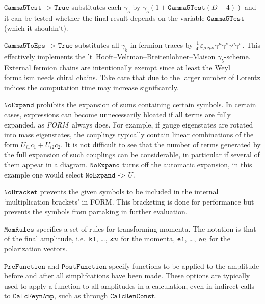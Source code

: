 \documentclass[twoside,11pt]{article}
\def\FO{\textit{FORM}}
\def\Var#1{\ensuremath{\mathit{#1}}}
\def\Vn{\Var{n}}
\def\Code#1{\ensuremath{\texttt{#1}}}
\def\ie{i.e.\ }
\begin{document}
\Code{Gamma5Test -> True} substitutes each $\gamma_5$ by
$\gamma_5 (1 + \Code{Gamma5Test} (D - 4))$ and it can be tested whether 
the final result depends on the variable \Code{Gamma5Test} (which it 
shouldn't).

%
%
\Code{Gamma5ToEps -> True} substitutes all $\gamma_5$ in fermion 
traces by $\frac 1{4!} \varepsilon_{\mu\nu\rho\sigma} \gamma^\mu 
\gamma^\nu \gamma^\rho \gamma^\sigma$.  This effectively implements the 
't~Hooft--Veltman--Breitenlohner--Maison $\gamma_5$-scheme.  External 
fermion chains are intentionally exempt since at least the Weyl 
formalism needs chiral chains.  Take care that due to the larger number 
of Lorentz indices the computation time may increase significantly.

%
%
\Code{NoExpand} prohibits the expansion of sums containing certain symbols.
In certain cases, expressions can become unnecessarily bloated if all
terms are fully expanded, as \FO\ always does.  For example, if gauge
eigenstates are rotated into mass eigenstates, the couplings typically
contain linear combinations of the form $U_{i1} c_1 + U_{i2} c_2$.  It is
not difficult to see that the number of terms generated by the full
expansion of such couplings can be considerable, in particular if several
of them appear in a diagram.  \Code{NoExpand} turns off the automatic
expansion, in this example one would select \Code{NoExpand -> $U$}.

\Code{NoBracket} prevents the given symbols to be included in the
internal `multiplication brackets' in FORM.  This bracketing is done for
performance but prevents the symbols from partaking in further evaluation.

\Code{MomRules} specifies a set of rules for transforming momenta.  The 
notation is that of the final amplitude, \ie \Code{k1}, \dots, 
\Code{k\Vn} for the momenta, \Code{e1}, \dots, \Code{e\Vn} for the 
polarization vectors.

\Code{PreFunction} and \Code{PostFunction} specify functions to be 
applied to the amplitude before and after all simplifcations have been 
made.  These options are typically used to apply a function to all 
amplitudes in a calculation, even in indirect calls to 
\Code{CalcFeynAmp}, such as through \Code{CalcRenConst}.
\end{document}
